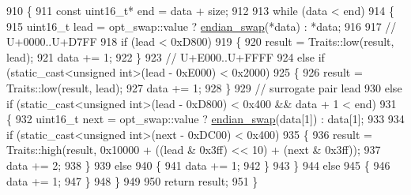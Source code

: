 \begin{DoxyCode}
910         \{
911             \textcolor{keyword}{const} uint16\_t* end = data + size;
912 
913             \textcolor{keywordflow}{while} (data < end)
914             \{
915                 uint16\_t lead = opt\_swap::value ? \hyperlink{pugixml_8cpp_a6d31b21cfa4167d79865a7797b33f3f1}{endian\_swap}(*data) : *data;
916 
917                 \textcolor{comment}{// U+0000..U+D7FF}
918                 \textcolor{keywordflow}{if} (lead < 0xD800)
919                 \{
920                     result = Traits::low(result, lead);
921                     data += 1;
922                 \}
923                 \textcolor{comment}{// U+E000..U+FFFF}
924                 \textcolor{keywordflow}{else} \textcolor{keywordflow}{if} (static\_cast<unsigned int>(lead - 0xE000) < 0x2000)
925                 \{
926                     result = Traits::low(result, lead);
927                     data += 1;
928                 \}
929                 \textcolor{comment}{// surrogate pair lead}
930                 \textcolor{keywordflow}{else} \textcolor{keywordflow}{if} (static\_cast<unsigned int>(lead - 0xD800) < 0x400 && data + 1 < end)
931                 \{
932                     uint16\_t next = opt\_swap::value ? \hyperlink{pugixml_8cpp_a6d31b21cfa4167d79865a7797b33f3f1}{endian\_swap}(data[1]) : data[1];
933 
934                     \textcolor{keywordflow}{if} (static\_cast<unsigned int>(next - 0xDC00) < 0x400)
935                     \{
936                         result = Traits::high(result, 0x10000 + ((lead & 0x3ff) << 10) + (next & 0x3ff));
937                         data += 2;
938                     \}
939                     \textcolor{keywordflow}{else}
940                     \{
941                         data += 1;
942                     \}
943                 \}
944                 \textcolor{keywordflow}{else}
945                 \{
946                     data += 1;
947                 \}
948             \}
949 
950             \textcolor{keywordflow}{return} result;
951         \}
\end{DoxyCode}
